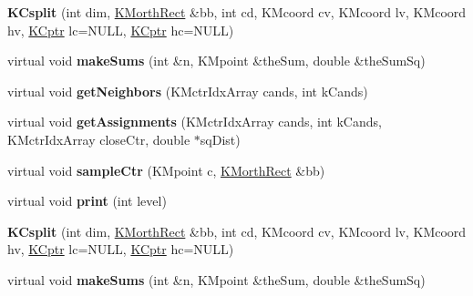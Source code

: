 \begin{DoxyCompactItemize}
\item 
\hypertarget{class_k_csplit_a0107bac39232ddac4c2647d82db25b35}{
{\bfseries KCsplit} (int dim, \hyperlink{class_k_morth_rect}{KMorthRect} \&bb, int cd, KMcoord cv, KMcoord lv, KMcoord hv, \hyperlink{class_k_cnode}{KCptr} lc=NULL, \hyperlink{class_k_cnode}{KCptr} hc=NULL)}
\label{class_k_csplit_a0107bac39232ddac4c2647d82db25b35}

\item 
\hypertarget{class_k_csplit_a0fd231005f318530a52544fcd370fe42}{
virtual void {\bfseries makeSums} (int \&n, KMpoint \&theSum, double \&theSumSq)}
\label{class_k_csplit_a0fd231005f318530a52544fcd370fe42}

\item 
\hypertarget{class_k_csplit_afaa6181c7fb763ac2985d1a4d35e85c8}{
virtual void {\bfseries getNeighbors} (KMctrIdxArray cands, int kCands)}
\label{class_k_csplit_afaa6181c7fb763ac2985d1a4d35e85c8}

\item 
\hypertarget{class_k_csplit_add37264def4334498ae98696073a8f3a}{
virtual void {\bfseries getAssignments} (KMctrIdxArray cands, int kCands, KMctrIdxArray closeCtr, double $\ast$sqDist)}
\label{class_k_csplit_add37264def4334498ae98696073a8f3a}

\item 
\hypertarget{class_k_csplit_af72bafaa30ff384ad1464002fc0fcf5c}{
virtual void {\bfseries sampleCtr} (KMpoint c, \hyperlink{class_k_morth_rect}{KMorthRect} \&bb)}
\label{class_k_csplit_af72bafaa30ff384ad1464002fc0fcf5c}

\item 
\hypertarget{class_k_csplit_a3097973206911dc6bc93f4fe4622eb4c}{
virtual void {\bfseries print} (int level)}
\label{class_k_csplit_a3097973206911dc6bc93f4fe4622eb4c}

\item 
\hypertarget{class_k_csplit_a0107bac39232ddac4c2647d82db25b35}{
{\bfseries KCsplit} (int dim, \hyperlink{class_k_morth_rect}{KMorthRect} \&bb, int cd, KMcoord cv, KMcoord lv, KMcoord hv, \hyperlink{class_k_cnode}{KCptr} lc=NULL, \hyperlink{class_k_cnode}{KCptr} hc=NULL)}
\label{class_k_csplit_a0107bac39232ddac4c2647d82db25b35}

\item 
\hypertarget{class_k_csplit_acda18987254f68ad66ecbbc92d4655c6}{
virtual void {\bfseries makeSums} (int \&n, KMpoint \&theSum, double \&theSumSq)}
\label{class_k_csplit_acda18987254f68ad66ecbbc92d4655c6}


\end{DoxyCompactItemize}
